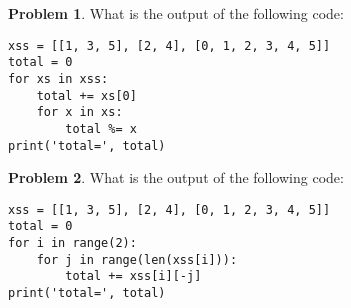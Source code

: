 \documentclass[10pt]{article}
\theoremstyle{definition}
\newtheorem{problem}{Problem}
\begin{document}
\newpage
\begin{problem}
    What is the output of the following code:
\end{problem}
\begin{lstlisting}
xss = [[1, 3, 5], [2, 4], [0, 1, 2, 3, 4, 5]]
total = 0
for xs in xss:
    total += xs[0]
    for x in xs:
        total %= x
print('total=', total)
\end{lstlisting}
\vspace{1.5in}


\begin{problem}
    What is the output of the following code:
\end{problem}
\begin{lstlisting}
xss = [[1, 3, 5], [2, 4], [0, 1, 2, 3, 4, 5]]
total = 0
for i in range(2):
    for j in range(len(xss[i])):
        total += xss[i][-j]
print('total=', total)
\end{lstlisting}
\vspace{1.5in}
\end{document}
